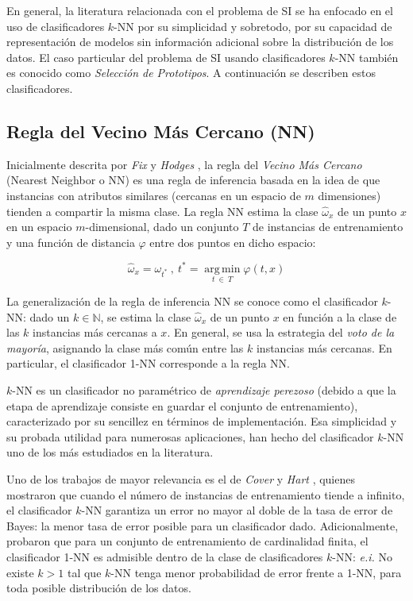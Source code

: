 En general, la literatura relacionada con el problema de SI se ha enfocado en el uso de clasificadores $k$-NN \cite{Garcia:2012:PSN:2122272.2122582} por su simplicidad y sobretodo, por su capacidad de representación de modelos sin información adicional sobre la distribución de los datos. El caso particular del problema de SI usando clasificadores $k$-NN también es conocido como \emph{Selección de Prototipos}. A continuación se describen estos clasificadores.

\subsection{Regla del Vecino Más Cercano (NN)}

Inicialmente descrita por \emph{Fix} y \emph{Hodges} \cite{fix_51_discriminatory}, la regla del \emph{Vecino Más Cercano} (Nearest Neighbor o NN) es una regla de inferencia basada en la idea de que instancias con atributos similares (cercanas en un espacio de $m$ dimensiones) tienden a compartir la misma clase. La regla NN estima la clase $\hat{\omega}_x$ de un punto $x$ en un espacio $m$-dimensional, dado un conjunto $T$ de instancias de entrenamiento y una función de distancia $\varphi$ entre dos puntos en dicho espacio:

\begin{equation}
\hat{\omega}_x = \omega_{t^*}\ ,\ 
t^* = \operatorname*{arg\,min}_{t\ \in\ T} \varphi(t,x)
\end{equation}

La generalización de la regla de inferencia NN se conoce como el clasificador $k$-NN: dado un $k \in \mathbb{N}$, se estima la clase $\hat{\omega}_x$ de un punto $x$ en función a la clase de las $k$ instancias más cercanas a $x$. En general, se usa la estrategia del \guillemotleft\emph{voto de la mayoría}\guillemotright, asignando la clase más común entre las $k$ instancias más cercanas. En particular, el clasificador 1-NN corresponde a la regla NN.

$k$-NN es un clasificador no paramétrico de \emph{aprendizaje perezoso} (debido a que la etapa de aprendizaje consiste en guardar el conjunto de entrenamiento), caracterizado por su sencillez en términos de implementación. Esa simplicidad y su probada utilidad para numerosas aplicaciones, han hecho del clasificador $k$-NN uno de los más estudiados en la literatura.

Uno de los trabajos de mayor relevancia es el de \emph{Cover} y \emph{Hart} \cite{Cover:2006:NNP:2263261.2267456}, quienes mostraron que cuando el número de instancias de entrenamiento tiende a infinito, el clasificador $k$-NN garantiza un error no mayor al doble de la tasa de error de Bayes: la menor tasa de error posible para un clasificador dado. Adicionalmente, probaron que para un conjunto de entrenamiento de cardinalidad finita, el clasificador 1-NN es admisible dentro de la clase de clasificadores $k$-NN: \emph{e.i.} No existe $k > 1$ tal que $k$-NN tenga menor probabilidad de error frente a 1-NN, para toda posible distribución de los datos.


